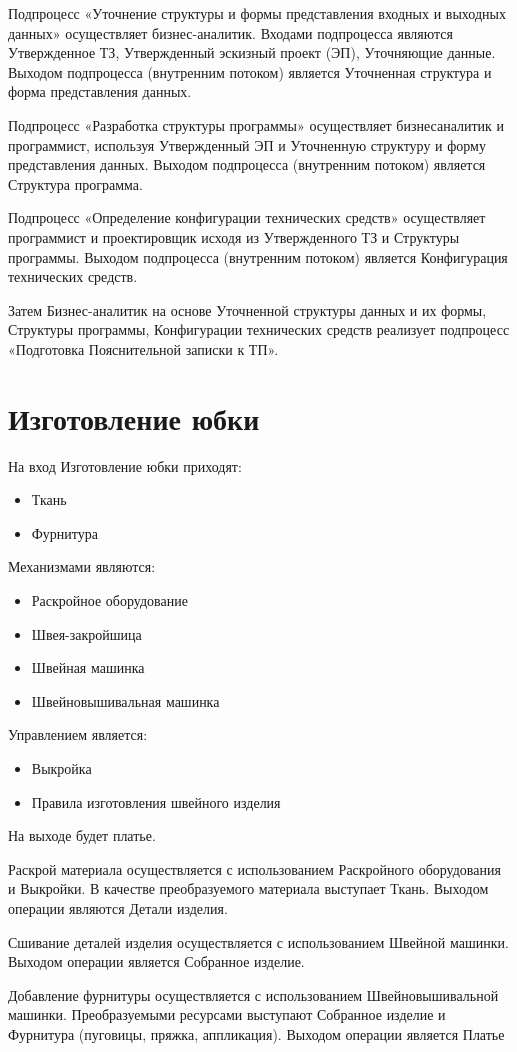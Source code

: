 Подпроцесс «Уточнение структуры и формы представления входных и
выходных данных» осуществляет бизнес-аналитик.
Входами подпроцесса  являются Утвержденное ТЗ, Утвержденный эскизный проект (ЭП),
Уточняющие данные.
Выходом подпроцесса (внутренним потоком) является Уточненная структура и форма представления данных.

Подпроцесс «Разработка структуры программы» осуществляет бизнесаналитик и программист, используя
Утвержденный ЭП и Уточненную структуру и форму представления данных.
Выходом подпроцесса (внутренним потоком) является Структура программа.

Подпроцесс «Определение конфигурации технических средств»
осуществляет программист и проектировщик исходя из Утвержденного ТЗ и
Структуры программы.
Выходом подпроцесса (внутренним потоком) является Конфигурация технических средств.

Затем Бизнес-аналитик на основе Уточненной структуры данных и их
формы, Структуры программы, Конфигурации технических средств реализует
подпроцесс «Подготовка Пояснительной записки к ТП».



\section{Изготовление юбки}

На вход Изготовление юбки приходят:
\begin{itemize}
	\item Ткань
	\item Фурнитура
\end{itemize}

Механизмами являются:
\begin{itemize}
	\item Раскройное оборудование
	\item Швея-закройшица
	\item Швейная машинка
	\item Швейновышивальная машинка
\end{itemize}

Управлением является:
\begin{itemize}
	\item Выкройка
	\item Правила изготовления швейного изделия
\end{itemize}

На выходе будет платье.

\newpage

Раскрой материала осуществляется с использованием Раскройного оборудования и Выкройки.
В качестве преобразуемого материала выступает Ткань.
Выходом операции являются Детали изделия.

Сшивание деталей изделия осуществляется с использованием Швейной машинки.
Выходом операции является Собранное изделие.

Добавление фурнитуры осуществляется с использованием Швейновышивальной машинки.
Преобразуемыми ресурсами выступают Собранное изделие и Фурнитура (пуговицы, пряжка, аппликация).
Выходом операции является Платье

